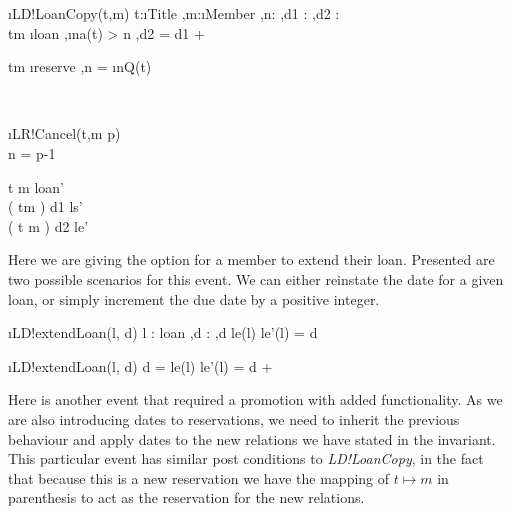 \documentclass[12pt,a4paper]{article}
\begin{document}
\begin{showspecs}
	\begin{spec}{\i{LD!LoanCopy(t,m)}}
		t:\i{Title} \sep m:\i{Member} \sep n:  \sep d1 :  \sep d2 :  \\
		t\mapsto m \notin \i{loan} \sep \i{na}(t) > n \sep d2 = d1 + \\
		\begin{alt}
			t\mapsto m \notin \i{reserve} \sep n = \i{nQ}(t)
		\end{alt}\\
		\begin{alt}
			\!\i{LR!Cancel}(t,m \to p)\\
			n = p-1
		\end{alt}
		
	\post

		t \mapsto m \in loan'\\
		( t\mapsto m ) \mapsto d1 \in ls' \\
		( t \mapsto m ) \mapsto d2 \in le'
	\end{spec}
\end{showspecs}	

\medskip\noindent Here we are giving the option for a member to extend their loan. Presented are two possible scenarios for this event. We can either reinstate the date for a given loan, or simply increment the due date by a positive integer. 
		
\begin{showspecs}
	\begin{spec}{\i{LD!extendLoan(l, d)}}
		l : loan \sep d :  \sep d \neq le(l)
	\post
		le'(l) = d
	\end{spec}
	
\showbeside
	\begin{spec}[\equiv]{\i{LD!extendLoan(l, d)}}
		d = le(l)
	\post
		le'(l) = d + 
	\end{spec}
\end{showspecs}	
		
\medskip\noindent Here is another event that required a promotion with added functionality. As we are also introducing dates to reservations, we need to inherit the previous behaviour and apply dates to the new relations we have stated in the invariant. This particular event has similar post conditions to \emph{LD!LoanCopy}, in the fact that because this is a new reservation we have the mapping of \emph{$ t \mapsto m$} in parenthesis to act as the reservation for the new relations.
		
\end{document}
